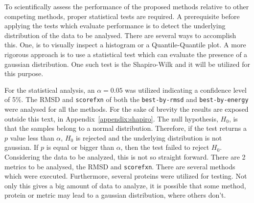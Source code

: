 
To scientifically assess the performance of the proposed methods relative to
other competing methods, proper statistical tests are required. A prerequisite
before applying the tests which evaluate performance is to detect the
underlying distribution of the data to be analysed. There are several ways to
accomplish this. One, is to visually inspect a histogram or a Quantile-Quantile
plot. A more rigorous approach is to use a statistical test which can evaluate
the presence of a gaussian distribution. One such test is the Shapiro-Wilk and it
will be utilized for this purpose.

For the statistical analysis, an $\alpha = 0.05$ was utilized indicating a confidence level of 5\%. The RMSD and \texttt{scorefxn} of both the \texttt{best-by-rmsd} and \texttt{best-by-energy} were analysed for all the methods. For the sake of brevity the results are exposed outside this
text, in Appendix~\ref{appendix:shapiro}. The null hypothesis, $H_0$, is that
the samples belong to a normal distribution. Therefore, if the test returns a $p$
value less than $\alpha$, $H_0$ is rejected and the underlying distribution is
not gaussian. If $p$ is equal or bigger than $\alpha$, then the test failed to
reject $H_0$. Considering the data to be analyzed, this is not so straight
forward. There are 2 metrics to be analysed, the RMSD and \texttt{scorefxn}.
There are several methods which were executed. Furthermore, several proteins
were utilized for testing. Not only this gives a big amount of data to analyze,
it is possible that some method, protein or metric may lead to a gaussian
distribution, where others don't.

